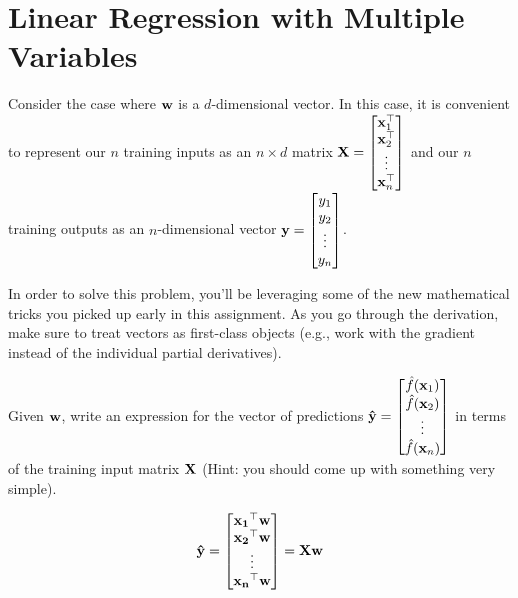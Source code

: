 \documentclass[assignment02_Solutions]{subfiles}
\begin{document}
\section{Linear Regression with Multiple Variables}
\begin{exercise}[(40 minutes)]
Consider the case where $\mathbf{w}$ is a $d$-dimensional vector.  In this case, it is convenient to represent our $n$ training inputs as an $n \times d$ matrix $\mathbf{X} = \begin{bmatrix} \mathbf{x}_1^\top \\ \mathbf{x}_2^\top \\ \vdots \\ \mathbf{x}_n^\top \end{bmatrix}$ and our $n$ training outputs as an $n$-dimensional vector $\mathbf{y} = \begin{bmatrix} y_1 \\ y_2 \\ \vdots \\ y_n \end{bmatrix}$.

In order to solve this problem, you'll be leveraging some of the new mathematical tricks you picked up early in this assignment.  As you go through the derivation, make sure to treat vectors as first-class objects (e.g., work with the gradient instead of the individual partial derivatives).
\bes

\item Given $\mathbf{w}$, write an expression for the vector of predictions $\mathbf{\hat{y}} = \begin{bmatrix} \hat{f}(\mathbf{x}_1) \\  \hat{f}(\mathbf{x}_2) \\  \vdots \\  \hat{f}(\mathbf{x}_n)\end{bmatrix}$ in terms of the training input matrix $\mathbf{X}$ (Hint: you should come up with something very simple).

\begin{boxedsolution}
$$\mathbf{\hat{y}} = \begin{bmatrix} \mathbf{x_1}^\top  \mathbf{w} \\ \mathbf{x_2}^\top \mathbf{w} \\ \vdots \\ \mathbf{x_n}^\top \mathbf{w} \end{bmatrix} = \mathbf{X} \mathbf{w}$$
\end{boxedsolution}


\end{exercise}
\end{document}
